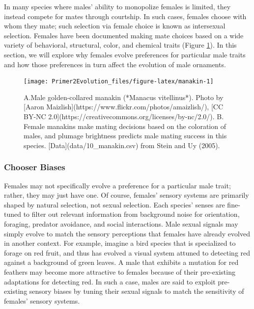 \documentclass[
]{book}
\begin{document}
In many species where males' ability to monopolize females is limited, they instead compete for mates through courtship. In such cases, females choose with whom they mate; such selection via female choice is known as intersexual selection. Females have been documented making mate choices based on a wide variety of behavioral, structural, color, and chemical traits (Figure \ref{fig:manakin}). In this section, we will explore why females evolve preferences for particular male traits and how those preferences in turn affect the evolution of male ornaments.

\begin{figure}
\texttt{[image: Primer2Evolution\_files/figure-latex/manakin-1]} \caption{A.Male golden-collared manakin (*Manacus vitellinus*). Photo by [Aaron Maizlish](https://www.flickr.com/photos/amaizlish/), [CC BY-NC 2.0](https://creativecommons.org/licenses/by-nc/2.0/). B. Female manakins make mating decisions based on the coloration of males, and plumage brightness predicts male mating success in this species. [Data](data/10_manakin.csv) from Stein and Uy (2005).}\label{fig:manakin}
\end{figure}

\hypertarget{chooser-biases}{%
\subsubsection*{Chooser Biases}\label{chooser-biases}}

Females may not specifically evolve a preference for a particular male trait; rather, they may just have one. Of course, females' sensory systems are primarily shaped by natural selection, not sexual selection. Each species' senses are fine-tuned to filter out relevant information from background noise for orientation, foraging, predator avoidance, and social interactions. Male sexual signals may simply evolve to match the sensory perceptions that females have already evolved in another context. For example, imagine a bird species that is specialized to forage on red fruit, and thus has evolved a visual system attuned to detecting red against a background of green leaves. A male that exhibits a mutation for red feathers may become more attractive to females because of their pre-existing adaptations for detecting red. In such a case, males are said to exploit pre-existing sensory biases by tuning their sexual signals to match the sensitivity of females' sensory systems.
\end{document}
